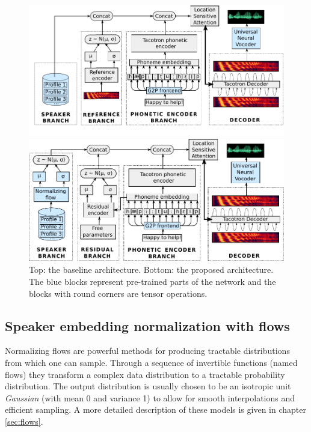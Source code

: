 \begin{figure}[h!]
	\centering

	\includegraphics[width=1.0\linewidth]{tts/images/baseline_architecture}

	\vspace{0.5cm}

	\includegraphics[width=1.0\linewidth]{tts/images/proposed_architecture}

	\caption[TTS baseline vs proposed architectures]{Top: the baseline architecture. Bottom: the proposed architecture. The blue blocks represent pre-trained parts of the network and the blocks with round corners are tensor operations.}
	\label{fig:architectures}
\end{figure}


\subsection{Speaker embedding normalization with flows}
Normalizing flows \autocite{rezende2015} are powerful methods for producing tractable distributions from which one can sample. Through a sequence of invertible functions (named flows) they transform a complex data distribution to a tractable probability distribution. The output distribution is usually chosen to be an isotropic unit \textit{Gaussian} (with mean 0 and variance 1) to allow for smooth interpolations and efficient sampling. A more detailed description of these models is given in chapter \ref{sec:flows}.

